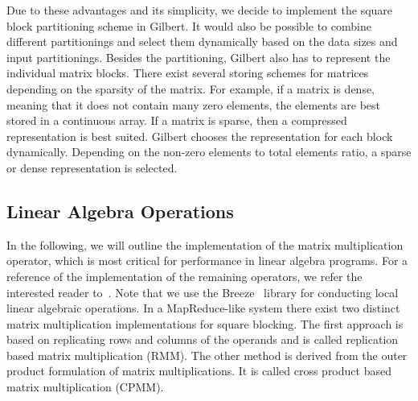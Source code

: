 Due to these advantages and its simplicity, we decide to implement the square block partitioning scheme in Gilbert. 
It would also be possible to combine different partitionings and select them dynamically based on the data sizes and input partitionings. 
Besides the partitioning, Gilbert also has to represent the individual matrix blocks. There exist several storing schemes for matrices depending on the sparsity of the matrix. 
For example, if a matrix is dense, meaning that it does not contain many zero elements, the elements are best stored in a continuous array. 
If a matrix is sparse, then a compressed representation is best suited. 
Gilbert chooses the representation for each block dynamically. 
Depending on the non-zero elements to total elements ratio, a sparse or dense representation is selected.

\subsection{Linear Algebra Operations}
\label{sec:LinearAlgebraOperations}

In the following, we will outline the implementation of the matrix multiplication operator, which is most critical for performance in linear algebra programs. 
For a reference of the implementation of the remaining operators, we refer the interested reader to~\cite{Rohrmann2014}. 
Note that we use the Breeze~\cite{breeze} library for conducting local linear algebraic operations. 
In a MapReduce-like system there exist two distinct matrix multiplication implementations for square blocking. 
The first approach is based on replicating rows and columns of the operands and is called replication based matrix multiplication (RMM). 
The other method is derived from the outer product formulation of matrix multiplications. 
It is called cross product based matrix multiplication (CPMM). 

